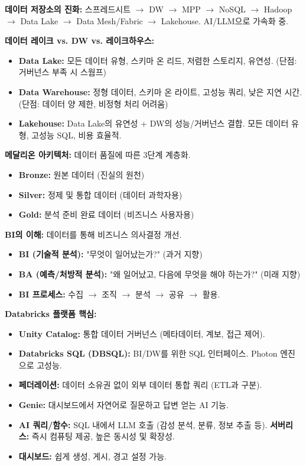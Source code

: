 \documentclass[11pt,a4paper]{article}
\theoremstyle{definition}
\begin{document}
\begin{summarybox}[title=CSCI103 Lecture 6 핵심 요약]
\textbf{데이터 저장소의 진화:} 스프레드시트 $\rightarrow$ DW $\rightarrow$ MPP $\rightarrow$ NoSQL $\rightarrow$ Hadoop $\rightarrow$ Data Lake $\rightarrow$ Data Mesh/Fabric $\rightarrow$ Lakehouse. AI/LLM으로 가속화 중.

\textbf{데이터 레이크 vs. DW vs. 레이크하우스:}
\begin{itemize}
    \item \textbf{Data Lake:} 모든 데이터 유형, 스키마 온 리드, 저렴한 스토리지, 유연성. (단점: 거버넌스 부족 시 스웜프)
    \item \textbf{Data Warehouse:} 정형 데이터, 스키마 온 라이트, 고성능 쿼리, 낮은 지연 시간. (단점: 데이터 양 제한, 비정형 처리 어려움)
    \item \textbf{Lakehouse:} Data Lake의 유연성 + DW의 성능/거버넌스 결합. 모든 데이터 유형, 고성능 SQL, 비용 효율적.
\end{itemize}

\textbf{메달리온 아키텍처:} 데이터 품질에 따른 3단계 계층화.
\begin{itemize}
    \item \textbf{Bronze:} 원본 데이터 (진실의 원천)
    \item \textbf{Silver:} 정제 및 통합 데이터 (데이터 과학자용)
    \item \textbf{Gold:} 분석 준비 완료 데이터 (비즈니스 사용자용)
\end{itemize}

\textbf{BI의 이해:} 데이터를 통해 비즈니스 의사결정 개선.
\begin{itemize}
    \item \textbf{BI (기술적 분석):} "무엇이 일어났는가?" (과거 지향)
    \item \textbf{BA (예측/처방적 분석):} "왜 일어났고, 다음에 무엇을 해야 하는가?" (미래 지향)
    \item \textbf{BI 프로세스:} 수집 $\rightarrow$ 조직 $\rightarrow$ 분석 $\rightarrow$ 공유 $\rightarrow$ 활용.
\end{itemize}

\textbf{Databricks 플랫폼 핵심:}
\begin{itemize}
    \item \textbf{Unity Catalog:} 통합 데이터 거버넌스 (메타데이터, 계보, 접근 제어).
    \item \textbf{Databricks SQL (DBSQL):} BI/DW를 위한 SQL 인터페이스. Photon 엔진으로 고성능.
    \item \textbf{페더레이션:} 데이터 소유권 없이 외부 데이터 통합 쿼리 (ETL과 구분).
    \item \textbf{Genie:} 대시보드에서 자연어로 질문하고 답변 얻는 AI 기능.
    \item \textbf{AI 쿼리/함수:} SQL 내에서 LLM 호출 (감성 분석, 분류, 정보 추출 등).
    \textbf{서버리스:} 즉시 컴퓨팅 제공, 높은 동시성 및 확장성.
    \item \textbf{대시보드:} 쉽게 생성, 게시, 경고 설정 가능.
\end{itemize}


\end{summarybox}
\end{document}
